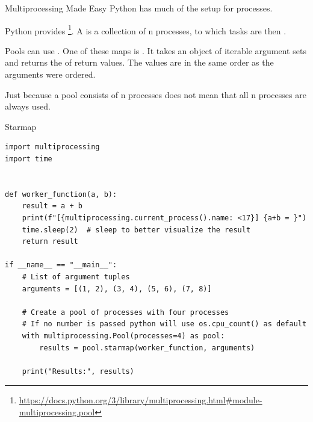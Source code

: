 \documentclass[12pt, aspectratio=169, usepdftitle=false, handout]{beamer}
\newcommand{\pp}[1]{\lpl{#1}}
\begin{document}
\begin{frame}[fragile]{Multiprocessing Made Easy}
        Python has  much of the setup for processes.

		\medskip
		
		\pause
		
		Python provides \footnote{\url{https://docs.python.org/3/library/multiprocessing.html\#module-multiprocessing.pool}}.
		\newline
		A \pp{Pool} is a collection of n processes, to which tasks are then .
		
		\medskip
		
		\pause
		
		Pools can use . One of these maps is \pp{starmap}.
		\newline
		It takes an  object of iterable argument sets and returns the  of return values. The values are in the same order as the arguments were ordered.
		
		\medskip
		
		\pause
		
		Just because a pool consists of n processes does not mean that all n processes are always used.

\end{frame}


\begin{frame}[fragile]{Starmap}
	\begin{lstlisting}[language=pytiny]
import multiprocessing
import time


def worker_function(a, b):
    result = a + b
    print(f"[{multiprocessing.current_process().name: <17}] {a+b = }")
    time.sleep(2)  # sleep to better visualize the result
    return result

if __name__ == "__main__":
    # List of argument tuples
    arguments = [(1, 2), (3, 4), (5, 6), (7, 8)]

    # Create a pool of processes with four processes
    # If no number is passed python will use os.cpu_count() as default
    with multiprocessing.Pool(processes=4) as pool:
        results = pool.starmap(worker_function, arguments)

    print("Results:", results)

	\end{lstlisting}
\end{frame}
\end{document}
